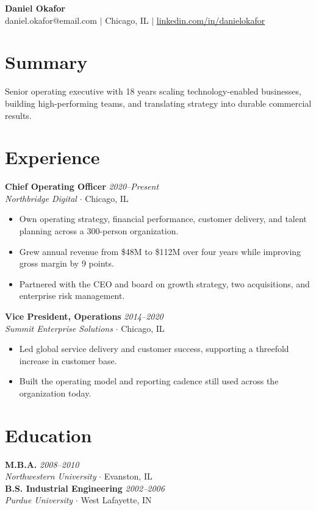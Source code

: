 \documentclass[11pt,letterpaper]{article}
\begin{document}
\begin{center}
  {\fontsize{22}{25}\selectfont\bfseries Daniel Okafor}\\[4pt]
  {daniel.okafor@email.com \quad $\vert$ \quad Chicago, IL \quad $\vert$ \quad \href{https://linkedin.com/in/danielokafor}{linkedin.com/in/danielokafor}}
\end{center}

\section{Summary}
\noindent Senior operating executive with 18 years scaling technology-enabled businesses, building high-performing teams, and translating strategy into durable commercial results.

\section{Experience}
\noindent\textbf{Chief Operating Officer} \hfill {\small\textit{2020--Present}}\\
\textit{Northbridge Digital} $\cdot$ {\small Chicago, IL}
\begin{itemize}
  \item Own operating strategy, financial performance, customer delivery, and talent planning across a 300-person organization.
  \item Grew annual revenue from \$48M to \$112M over four years while improving gross margin by 9 points.
  \item Partnered with the CEO and board on growth strategy, two acquisitions, and enterprise risk management.
\end{itemize}
\vspace{4pt}
\noindent\textbf{Vice President, Operations} \hfill {\small\textit{2014--2020}}\\
\textit{Summit Enterprise Solutions} $\cdot$ {\small Chicago, IL}
\begin{itemize}
  \item Led global service delivery and customer success, supporting a threefold increase in customer base.
  \item Built the operating model and reporting cadence still used across the organization today.
\end{itemize}

\section{Education}
\noindent\textbf{M.B.A.} \hfill {\small\textit{2008--2010}}\\
\textit{Northwestern University} $\cdot$ {\small Evanston, IL}\\
\noindent\textbf{B.S. Industrial Engineering} \hfill {\small\textit{2002--2006}}\\
\textit{Purdue University} $\cdot$ {\small West Lafayette, IN}
\end{document}
